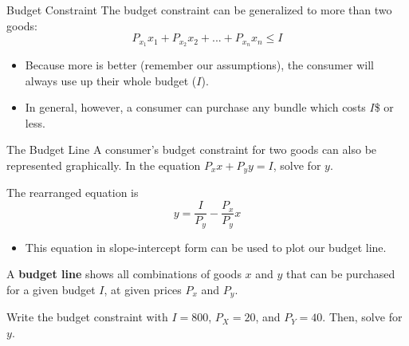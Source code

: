 \documentclass[12pt,t]{beamer}
\begin{document}
\begin{frame}{Budget Constraint}
  The budget constraint can be generalized to more than two goods:
  $$
    P_{x_1} x_1 + P_{x_2} x_2 + ... + P_{x_n} x_n \leq I
  $$

  \bigskip
  \begin{itemize}
    \item Because more is better (remember our assumptions), the consumer will always use up their whole budget ($I$).

    \item In general, however, a consumer can purchase any bundle which costs $I$\$ or less.
  \end{itemize}
\end{frame}

\begin{frame}{The Budget Line}
  A consumer's budget constraint for two goods can also be represented graphically. In the equation $P_x x + P_y y = I$, solve for $y$.
  
  \pause\bigskip
  The rearranged equation is 
  $$
    y = \frac{I}{P_y} - \frac{P_x}{P_y}x
  $$
  
  \begin{itemize}
    \item This equation in slope-intercept form can be used to plot our budget line.
  \end{itemize}

  \bigskip
  A \textbf{budget line} shows all combinations of goods $x$ and $y$ that can be purchased for a given budget $I$, at given prices $P_x$ and $P_y$.
\end{frame}

\begin{frame}

  \bigskip
  Write the budget constraint with $I = 800$, $P_X = 20$, and $P_Y = 40$. Then, solve for $y$.
\end{frame}
\end{document}
